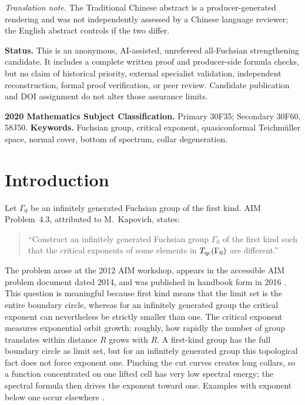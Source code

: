 \documentclass[11pt]{article}
\theoremstyle{definition}
\begin{document}
\smallskip
\noindent\emph{Translation note.} The Traditional Chinese abstract is a
producer-generated rendering and was not independently assessed by a Chinese
language reviewer; the English abstract controls if the two differ.

\medskip
\noindent\colorbox{statusred!8}{\parbox{0.95\linewidth}{
\textcolor{statusred}{\textbf{Status.}} This is an anonymous, AI-assisted,
unrefereed all-Fuchsian strengthening candidate.  It includes a complete written proof and
producer-side formula checks, but no claim of historical priority, external
specialist validation, independent reconstruction, formal proof verification,
or peer review.  Candidate publication and DOI assignment do not alter those
assurance limits.}}

\medskip
\noindent\textbf{2020 Mathematics Subject Classification.}
Primary 30F35; Secondary 30F60, 58J50.\quad
\textbf{Keywords.} Fuchsian group, critical exponent, quasiconformal
Teichm\"uller space, normal cover, bottom of spectrum, collar degeneration.

\tableofcontents

\section{Introduction}

Let $\Gamma_0$ be an infinitely generated Fuchsian group of the first kind.
AIM Problem~4.3, attributed to M.~Kapovich, states:
\begin{quote}
``Construct an infinitely generated Fuchsian group $\Gamma_0$ of the first kind
such that the critical exponents of some elements in $T_{\rm qc}(\Gamma_0)$ are
different.''
\end{quote}
The problem arose at the 2012 AIM workshop, appears in the accessible AIM
problem document dated 2014, and was published in handbook form in 2016
\citep{AIM2014,Su2016}.  This question is meaningful because first kind means that the
limit set is the entire boundary circle, whereas for an infinitely generated
group the critical exponent can nevertheless be strictly smaller than one.
The critical exponent measures exponential orbit growth: roughly, how rapidly
the number of group translates within distance $R$ grows with $R$.  A first-kind
group has the full boundary circle as limit set, but for an infinitely generated
group this topological fact does not force exponent one.  Pinching the cut
curves creates long collars, so a function concentrated on one lifted cell has
very low spectral energy; the spectral formula then drives the exponent toward
one.  Examples with exponent below one occur elsewhere
\citep{Bishop2003,Lehnert2017}.
\end{document}
